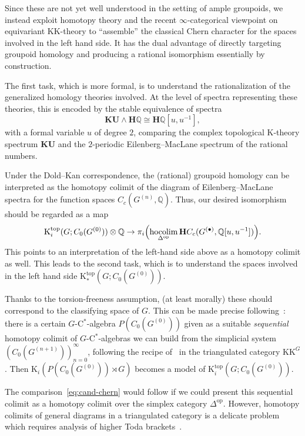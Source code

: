 \documentclass[a4paper,reqno]{amsart}
\theoremstyle{plain}
\theoremstyle{definition}
\theoremstyle{remark}
\numberwithin{equation}{section}
\newcommand{\rK}{\mathrm{K}}
\newcommand{\dQ}{\mathbb{Q}}
\newcommand{\bH}{\mathbf{H}}
\DeclareMathOperator*{\hocolim}{hocolim}
\newcommand{\KK}{\mathrm{KK}}
\newcommand{\opo}{\mathrm{op}}
\newcommand{\KU}{\mathbf{KU}}
\begin{document}
Since these are not yet well understood in the setting of ample groupoids, we instead exploit homotopy theory and the recent $\infty$-categorical viewpoint on equivariant $\KK$-theory to ``assemble'' the classical Chern character for the spaces involved in the left hand side.
It has the dual advantage of directly targeting groupoid homology and producing a rational isomorphism essentially by construction.

The first task, which is more formal, is to understand the rationalization of the generalized homology theories involved.
At the level of spectra representing these theories, this is encoded by the stable equivalence of spectra
\begin{equation}\label{eq:chern-intro}
\KU\wedge \bH\dQ \cong \bH\dQ [u,u^{-1}],
\end{equation}
with a formal variable $u$ of degree $2$, comparing the complex topological $\rK$-theory spectrum $\KU$ and the $2$-periodic Eilenberg--MacLane spectrum of the rational numbers.

Under the Dold--Kan correspondence, the (rational) groupoid homology can be interpreted as the homotopy colimit of the diagram of Eilenberg--MacLane spectra for the function spaces $C_c(G^{(n)}, \dQ)$.
Thus, our desired isomorphism should be regarded as a map
\begin{equation}\label{eq:cand-chern}
\rK_i^{\mathrm{top}}(G; C_0(G^{(0)})) \otimes \dQ \to \pi_i\Bigl(\hocolim_{\Delta^\opo} \bH C_c(G^{(\bullet)},\dQ[u,u^{-1}])\Bigr).
\end{equation}
This points to an interpretation of the left-hand side above as a homotopy colimit as well.
This leads to the second task, which is to understand the spaces involved in the left hand side $\rK_*^{\mathrm{top}}(G; C_0(G^{(0)}))$.

Thanks to the torsion-freeness assumption, (at least morally) these should correspond to the classifying space of $G$.
This can be made precise following~: there is a certain $G$-C$^*$-algebra $P(C_0(G^{(0)}))$ given as a suitable \emph{sequential} homotopy colimit of $G$-C$^*$-algebras we can build from the simplicial system $(C_0(G^{(n+1)}))_{n = 0}^\infty$, following the recipe of~ in the triangulated category $\KK^G$.
Then $\rK_i(P(C_0(G^{(0)})) \rtimes G)$ becomes a model of $\rK_i^{\mathrm{top}}(G; C_0(G^{(0)}))$.

The comparison~\eqref{eq:cand-chern} would follow if we could present this sequential colimit as a homotopy colimit over the simplex category $\Delta^\opo$.
However, homotopy colimits of general diagrams in a triangulated category is a delicate problem which requires analysis of higher Toda brackets~\cite{bn:tot}.
\end{document}
